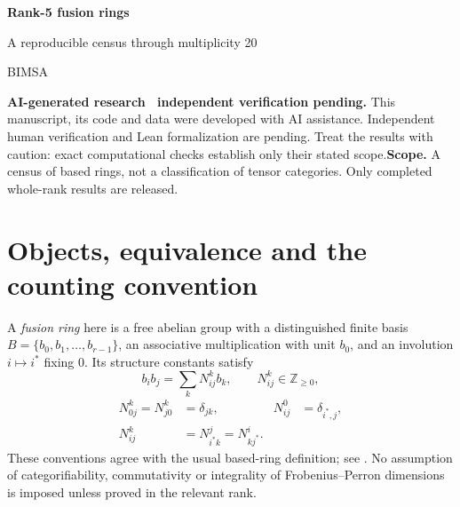 \documentclass[11pt,a4paper]{article}
\theoremstyle{definition}\newtheorem{definition}[theorem]{Definition}\newtheorem{remark}[theorem]{Remark}
\newcommand{\NN}{\mathbb Z_{\geq0}}\newcommand{\FPdim}{\operatorname{FPdim}}
\begin{document}
\par\vspace{1cm}
{\sffamily\Huge\bfseries\color{ink} Rank-5 fusion rings\par}
\vspace{0.35cm}
{\sffamily\Large A reproducible census through multiplicity 20\par}
\vspace{0.65cm}{\large Sébastien Palcoux}\par{\small BIMSA}\par\vspace{0.35cm}{\small Computational companion, 26 October 2026}\par\vspace{0.8cm}
\begin{abstract}
We explain the exact enumeration of all based fusion rings of rank 5 through multiplicity 20, comprising 40,999 isomorphism classes. The account separates the mathematical coverage argument, the completed search, and independent verification of the emitted tensors. All duality types are included, and no categorifiability filter is applied. Code, machine-readable counts, full multiplication tensors and provenance records accompany the text.
\end{abstract}\vspace{0.4cm}\noindent\textbf{AI-generated research \textperiodcentered\ independent verification pending.} This manuscript, its code and data were developed with AI assistance. Independent human verification and Lean formalization are pending. Treat the results with caution: exact computational checks establish only their stated scope.\vfill\noindent\textbf{Scope.} A census of based rings, not a classification of tensor categories. Only completed whole-rank results are released.\newpage\tableofcontents\newpage

\section{Objects, equivalence and the counting convention}
A \emph{fusion ring} here is a free abelian group with a distinguished finite basis
$B=\{b_0,b_1,\ldots,b_{r-1}\}$, an associative multiplication with unit $b_0$,
and an involution $i\mapsto i^*$ fixing $0$. Its structure constants satisfy
\[
b_i b_j=\sum_k N_{ij}^{k}b_k,\qquad N_{ij}^{k}\in\NN,
\]
\begin{align}
N_{0j}^{k}=N_{j0}^{k}&=\delta_{jk},&N_{ij}^{0}&=\delta_{i^*,j},\\
N_{ij}^{k}&=N_{i^*k}^{j}=N_{kj^*}^{i}.&&\label{eq:reciprocity}
\end{align}
These conventions agree with the usual based-ring definition; see
\cite{EGNO,VS}. No assumption of categorifiability, commutativity or integrality
of Frobenius--Perron dimensions is imposed unless proved in the relevant rank.
\end{document}

